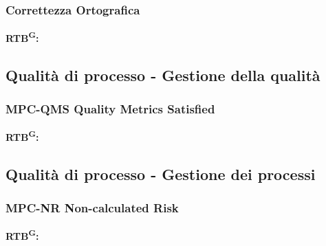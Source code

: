 \documentclass[8pt]{article}
\newcommand{\glossterm}[1]{#1\textsuperscript{G}} %
\begin{document}
\subsubsection{Correttezza Ortografica}
\textbf{\glossterm{RTB}:}
\subsection{Qualità di processo - Gestione della qualità}
\subsubsection{MPC-QMS Quality Metrics Satisfied}
\textbf{\glossterm{RTB}:}
\subsection{Qualità di processo - Gestione dei processi}
\subsubsection{MPC-NR Non-calculated Risk}
\textbf{\glossterm{RTB}:}
\end{document}
